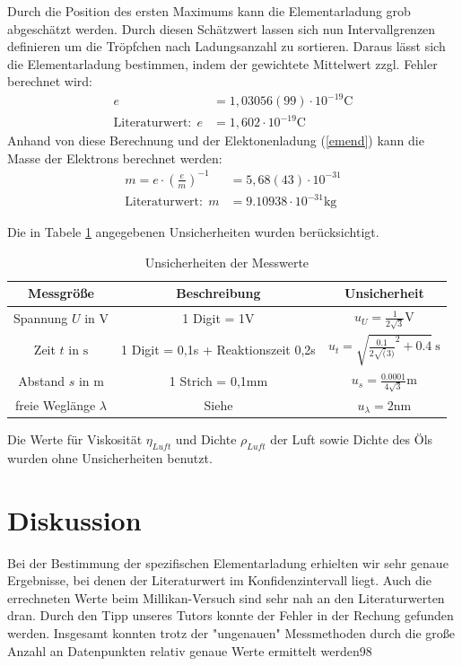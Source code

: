 \documentclass[11pt, a4paper]{article}
\begin{document}
    Durch die Position des ersten Maximums kann die Elementarladung grob abgeschätzt werden. Durch diesen Schätzwert lassen sich nun Intervallgrenzen definieren um die Tröpfchen nach Ladungsanzahl zu sortieren.
    Daraus lässt sich die Elementarladung bestimmen, indem der gewichtete Mittelwert zzgl. Fehler berechnet\cite[Kapitel 5]{ABW} wird:
    \begin{align}
        e &= 1,03056(99) \cdot 10^{-19} \si{\coulomb} \\
        \text{Literaturwert:} \ \ e &= 1,602 \cdot 10^{-19} \si{\coulomb}
    \end{align}
    Anhand von diese Berechnung und der Elektonenladung (\ref{emend}) kann die Masse der Elektrons berechnet werden:
    \begin{align}
        m = e \cdot \left(\frac{e}{m}\right)^{-1} &= 5,68(43) \cdot 10^{-31}\\
        \text{Literaturwert:} \ \ m &= 9.10938 \cdot 10^{-31} \si{\kilogram}
    \end{align}

    Die in Tabele \ref{unsichmili} angegebenen Unsicherheiten wurden berücksichtigt.
    \begin{table}
        \begin{tabular}{c | c | c}
            Messgröße & Beschreibung & Unsicherheit \\ \hline
            Spannung $U$ in $\si{\volt}$ & 1 Digit = 1V & $u_U = \frac{1}{2\sqrt{3}} \si{\volt}$ \\
            Zeit $t$ in $\si{\second}$ & 1 Digit = 0,1s + Reaktionszeit 0,2s & $u_t = \sqrt{\frac{0.1}{2\sqrt(3)}^2 + 0.4} \ \si{\second}$ \\            Abstand $s$ in $\si{\metre}$ & 1 Strich = 0,1mm & $u_s = \frac{0.0001}{4\sqrt{3}} \si{\metre}$ \\
            freie Weglänge $\lambda$ & Siehe \cite{ELE} & $u_\lambda = 2 \si{\nano\metre}$ \\
        \end{tabular}
        \caption{Unsicherheiten der Messwerte}
        \label{unsichmili}
    \end{table}
    Die Werte für Viskosität $\eta_{Luft}$ und Dichte $\rho_{Luft}$ der Luft \cite[]{Luft} sowie Dichte des Öls \cite{ELE} wurden ohne Unsicherheiten benutzt.




    \section{Diskussion}
    Bei der Bestimmung der spezifischen Elementarladung erhielten wir sehr genaue Ergebnisse, bei denen der Literaturwert im Konfidenzintervall liegt. Auch die errechneten Werte beim Millikan-Versuch sind sehr nah an den Literaturwerten dran. Durch den Tipp unseres Tutors konnte der Fehler in der Rechung gefunden werden. Insgesamt konnten trotz der "ungenauen" Messmethoden durch die große Anzahl an Datenpunkten relativ genaue Werte ermittelt werden98
    
\end{document}
